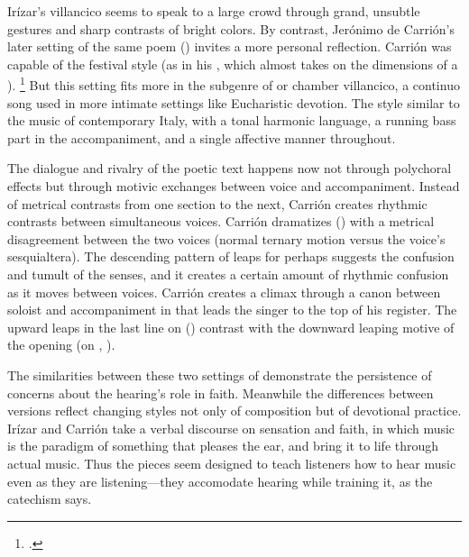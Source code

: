 Irízar's villancico seems to speak to a large crowd through grand, unsubtle gestures and sharp contrasts of bright colors.
By contrast, Jerónimo de Carrión's later setting of the same poem () invites a more personal reflection.%
\Autocite[\XXX]{Cashner:SingingAboutSingingI}
Carrión was capable of the festival style (as in his , which almost takes on the dimensions of a ).%
\footnote{\signature{E-SE}{\XXX}.}
But this setting fits more in the subgenre of  or chamber villancico, a continuo song used in more intimate settings like Eucharistic devotion.%
The style similar to the  music of contemporary Italy, with a tonal harmonic language, a running bass part in the accompaniment, and a single affective manner throughout.


The dialogue and rivalry of the poetic text happens now not through polychoral effects but through motivic exchanges between voice and accompaniment.
Instead of metrical contrasts from one section to the next, Carrión creates rhythmic contrasts between simultaneous voices.
Carrión dramatizes  () with a metrical disagreement between the two voices (normal ternary motion versus the voice's sesquialtera).
The descending pattern of leaps for  perhaps suggests the confusion and tumult of the senses, and it creates a certain amount of rhythmic confusion as it moves between voices.
Carrión creates a climax through a canon between soloist and accompaniment in  that leads the singer to the top of his register.
The upward leaps in the last line on  () contrast with the downward leaping motive of the opening (on , ).

The similarities between these two settings of  demonstrate the persistence of concerns about the hearing's role in faith.
Meanwhile the differences between versions reflect changing styles not only of composition but of devotional practice.
Irízar and Carrión take a verbal discourse on sensation and faith, in which music is the paradigm of something that pleases the ear, and bring it to life through actual music.
Thus the pieces seem designed to teach listeners how to hear music even as they are listening---they accomodate hearing while training it, as the catechism says.


